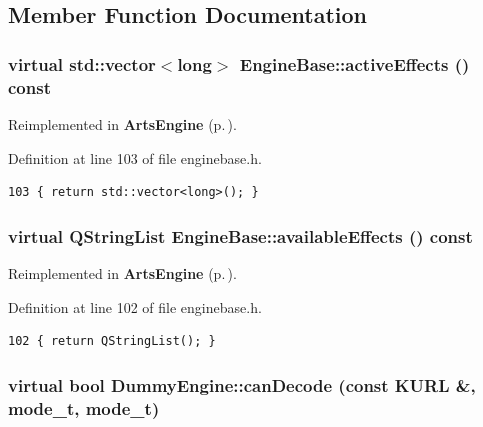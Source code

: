 \subsection{Member Function Documentation}
\subsubsection{\setlength{\rightskip}{0pt plus 5cm}virtual std::vector$<$long$>$ Engine\-Base::active\-Effects () const\hspace{0.3cm}{\tt  [inline, virtual, inherited]}}\label{classEngineBase_EngineBasea17}




Reimplemented in {\bf Arts\-Engine} {\rm (p.\,\pageref{classArtsEngine_ArtsEnginea11})}.

Definition at line 103 of file enginebase.h.



\footnotesize\begin{verbatim}103 { return std::vector<long>(); }
\end{verbatim}\normalsize 
{}
\subsubsection{\setlength{\rightskip}{0pt plus 5cm}virtual QString\-List Engine\-Base::available\-Effects () const\hspace{0.3cm}{\tt  [inline, virtual, inherited]}}\label{classEngineBase_EngineBasea16}




Reimplemented in {\bf Arts\-Engine} {\rm (p.\,\pageref{classArtsEngine_ArtsEnginea10})}.

Definition at line 102 of file enginebase.h.



\footnotesize\begin{verbatim}102 { return QStringList(); }
\end{verbatim}\normalsize 
{}
\subsubsection{\setlength{\rightskip}{0pt plus 5cm}virtual bool Dummy\-Engine::can\-Decode (const KURL \&, mode\_\-t, mode\_\-t)\hspace{0.3cm}{\tt  [inline, private, virtual]}}\label{classDummyEngine_DummyEngined2}




